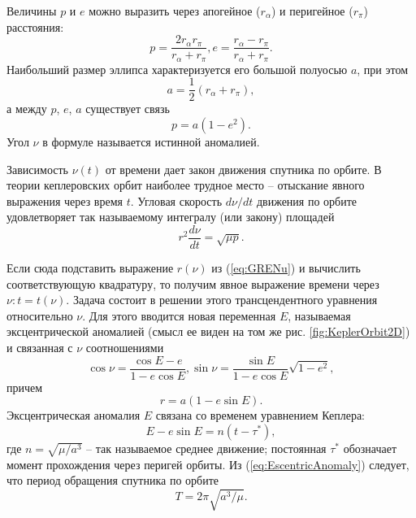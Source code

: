 Величины $p$ и $e$ можно выразить через апогейное
($r_{\alpha}$) и перигейное ($r_{\pi}$) расстояния:
\begin{equation}
  p = \frac{2r_{\alpha}r_{\pi}}{r_{\alpha} + r_{\pi}},
  e = \frac{r_{\alpha} - r_{\pi}}{r_{\alpha} + r_{\pi}}.
\end{equation}
Наибольший размер эллипса характеризуется его большой полуосью $a$, при этом
\begin{equation}
  a = \frac{1}{2}(r_{\alpha} + r_{\pi}),
\end{equation}
а между $p$, $e$, $a$ существует связь
\begin{equation}
  p = a(1 - e^2).
\end{equation}
Угол $\nu$ в формуле \label{eq:GRENu} называется истинной аномалией.\par
Зависимость $\nu(t)$ от времени дает закон движения спутника по орбите. В теории
кеплеровских орбит наиболее трудное место -- отыскание явного выражения через время
$t$. Угловая скорость $d\nu/dt$ движения по орбите удовлетворяет так называемому
интегралу (или закону) площадей
\begin{equation} \label{eq:GIntegralSquares}
  r^2\frac{d\nu}{dt} = \sqrt{\mu p}.
\end{equation}\par
Если сюда подставить выражение $r(\nu)$ из (\ref{eq:GRENu}) и вычислить соответствующую
квадратуру, то получим явное выражение времени через $\nu: t = t(\nu)$. Задача состоит
в решении этого трансцендентного уравнения относительно $\nu$. Для этого вводится
новая переменная $E$, называемая эксцентрической аномалией (смысл ее виден на том
же рис. \ref{fig:KeplerOrbit2D}) и связанная с $\nu$ соотношениями
\begin{equation}
  \cos\nu = \frac{\cos E - e}{1 - e\cos E}, \sin\nu = \frac{\sin E}{1 - e\cos E}\sqrt{1 - e^2},
\end{equation}
причем
\begin{equation}\label{eq:rFromEA}
  r = a(1 - e\sin E).
\end{equation}
Эксцентрическая аномалия $E$ связана со временем уравнением Кеплера:
\begin{equation} \label{eq:EscentricAnomaly}
  E - e\sin E = n(t-\tau^*),
\end{equation}
где $n = \sqrt{\mu/a^3}$ -- так называемое среднее движение; постоянная $\tau^*$
обозначает момент прохождения через перигей орбиты. Из (\ref{eq:EscentricAnomaly})
следует, что период обращения спутника по орбите
\begin{equation}
  T = 2\pi\sqrt{a^3/\mu}.
\end{equation}\par
